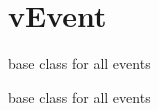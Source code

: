 \hypertarget{group__vEvent}{\section{v\-Event}
\label{group__vEvent}
}


base class for all events  


base class for all events 